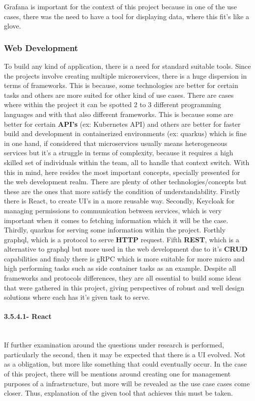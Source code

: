 Grafana is important for the context of this project because in one of the use cases, there was the need to have a tool for displaying data, where this fit's like a glove.

\subsubsection{Web Development}
To build any kind of application, there is a need for standard suitable tools. Since the projects involve creating multiple microservices, there is a huge dispersion in terms of frameworks. This is because, some technologies are better for certain tasks and others are more suited for other kind of use cases. There are cases where within the project it can be spotted 2 to 3 different programming languages and with that also different frameworks. This is because some are better for certain \textbf{API's} (ex: Kubernetes API) and others are better for faster build and development in containerized environments (ex: quarkus) which is fine in one hand, if considered that microservices usually means heterogeneous services but it's a struggle in terms of complexity, because it requires a high skilled set of individuals within the team, all to handle that context switch.
    With this in mind, here resides the most important concepts, specially presented for the web development realm. There are plenty of other technologies/concepts but these are the ones that more satisfy the condition of understandability.  Firstly there is React, to create UI's in a more reusable way. Secondly, Keycloak for managing permissions to communication between services, which is very important when it comes to fetching information which it will be the case. Thirdly, quarkus for serving some information within the project. Forthly graphql, which is a protocol to serve \textbf{HTTP} request. Fifth \textbf{REST}, which is a alternative to graphql but more used in the web development due to it's \textbf{CRUD} capabilities and finaly there is gRPC which is more suitable for more micro and high performing tasks such as side container tasks as an example.
Despite all frameworks and protocols differences, they are all essential to build some ideas that were gathered in this project, giving perspectives of robust and well design solutions where each has it's given task to serve.

\paragraph{3.5.4.1- React}\mbox{}\\
If further examination around the questions under research is performed, particularly the second, then it may be expected that there is a UI evolved. Not as a obligation, but more like something that could eventually occur. In the case of this project, there will be mentions around creating one for management purposes of a infrastructure, but more will be revealed as the use case cases come closer. Thus, explanation of the given tool that achieves this must be taken.

